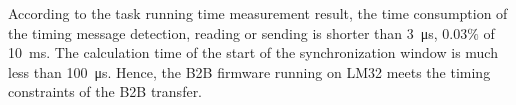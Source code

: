 According to the task running time measurement result, the time consumption of the timing message detection, reading or sending is shorter than \SI{3}{\us}, $0.03\%$ of \SI{10}{\ms}. The calculation time of the start of the synchronization window is much less than \SI{100}{\us}. Hence, the B2B firmware running on LM32 meets the timing constraints of the B2B transfer.
